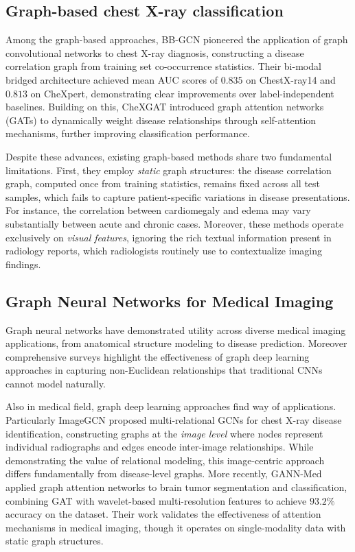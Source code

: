 \documentclass[
  journal=noname,
  manuscript=draft,
  year=,
  volume=,
]{cup-journal}
\begin{document}
\subsection{Graph-based chest X-ray classification}
\label{subsec:graph_cxr_classification}
Among the graph-based approaches, BB-GCN\autocite{bbcgn} pioneered the application of graph 
convolutional networks to chest X-ray diagnosis, constructing a disease 
correlation graph from training set co-occurrence statistics. Their 
bi-modal bridged architecture achieved mean AUC scores of $0.835$ on 
ChestX-ray14 and $0.813$ on CheXpert, demonstrating clear improvements 
over label-independent baselines. Building on this, CheXGAT\autocite{chexgat}
introduced graph attention networks (GATs) to 
dynamically weight disease relationships through self-attention 
mechanisms, further improving classification performance.

Despite these advances, existing graph-based methods share two 
fundamental limitations. First, they employ \textit{static} graph 
structures: the disease correlation graph, computed once from training 
statistics, remains fixed across all test samples, which fails to 
capture patient-specific variations in disease presentations. For 
instance, the correlation between cardiomegaly and edema may vary 
substantially between acute and chronic cases.
Moreover, these methods operate exclusively on \textit{visual features}, ignoring the rich 
textual information present in radiology reports, which radiologists 
routinely use to contextualize imaging findings.

\subsection{Graph Neural Networks for Medical Imaging}
\label{subsec:gnn_medical}

Graph neural networks have demonstrated utility across diverse medical 
imaging applications, from anatomical structure modeling to disease 
prediction\autocite{Ahmedt_Aristizabal_2021}. Moreover comprehensive surveys\autocite{zhou2021graphneuralnetworksreview}
highlight the effectiveness of graph deep learning approaches in capturing 
non-Euclidean relationships that traditional CNNs cannot model 
naturally.

Also in medical field, graph deep learning approaches find way of applications.
Particularly ImageGCN\autocite{imagegcn} proposed multi-relational GCNs for 
chest X-ray disease identification, constructing graphs at the 
\textit{image level} where nodes represent individual radiographs and 
edges encode inter-image relationships. While demonstrating the value 
of relational modeling, this image-centric approach differs 
fundamentally from disease-level graphs. More recently, GANN-Med\autocite{ALANAZI2025112372}
applied graph attention networks to brain tumor 
segmentation and classification, combining GAT with wavelet-based 
multi-resolution features to achieve $93.2\%$ accuracy on the dataset. Their work 
validates the effectiveness of attention mechanisms in medical imaging, 
though it operates on single-modality data with static graph structures.
\end{document}
